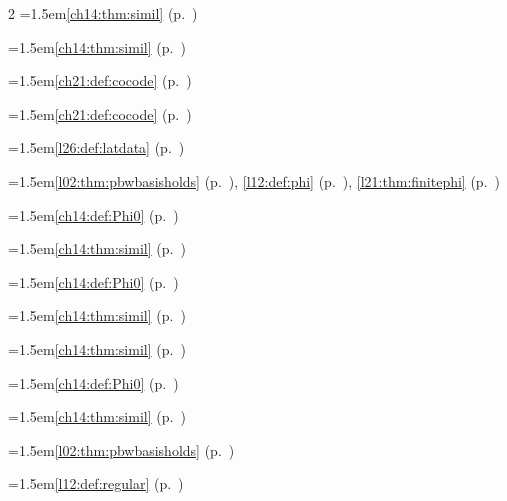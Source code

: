 \begin{multicols}{2}
\hangindent=1.5em\quad \ref{ch14:thm:simil} (p.~\pageref{ch14:thm:simil})\par
\hangindent=1.5em\quad \ref{ch14:thm:simil} (p.~\pageref{ch14:thm:simil})\par
\par{}\par\nopagebreak\smallskip
\hangindent=1.5em\quad \ref{ch21:def:cocode} (p.~\pageref{ch21:def:cocode})\par
\par{}\par\nopagebreak\smallskip
\hangindent=1.5em\quad \ref{ch21:def:cocode} (p.~\pageref{ch21:def:cocode})\par
\par{}\par\nopagebreak\smallskip
\hangindent=1.5em\quad \ref{l26:def:latdata} (p.~\pageref{l26:def:latdata})\par
\par{}\par\nopagebreak\smallskip
\hangindent=1.5em\quad \ref{l02:thm:pbwbasisholds} (p.~\pageref{l02:thm:pbwbasisholds}), \ref{l12:def:phi} (p.~\pageref{l12:def:phi}), \ref{l21:thm:finitephi} (p.~\pageref{l21:thm:finitephi})\par
\hangindent=1.5em\quad \ref{ch14:def:Phi0} (p.~\pageref{ch14:def:Phi0})\par
\hangindent=1.5em\quad \ref{ch14:thm:simil} (p.~\pageref{ch14:thm:simil})\par
\hangindent=1.5em\quad \ref{ch14:def:Phi0} (p.~\pageref{ch14:def:Phi0})\par
\hangindent=1.5em\quad \ref{ch14:thm:simil} (p.~\pageref{ch14:thm:simil})\par
\hangindent=1.5em\quad \ref{ch14:thm:simil} (p.~\pageref{ch14:thm:simil})\par
\hangindent=1.5em\quad \ref{ch14:def:Phi0} (p.~\pageref{ch14:def:Phi0})\par
\hangindent=1.5em\quad \ref{ch14:thm:simil} (p.~\pageref{ch14:thm:simil})\par
\hangindent=1.5em\quad \ref{l02:thm:pbwbasisholds} (p.~\pageref{l02:thm:pbwbasisholds})\par
\hangindent=1.5em\quad \ref{l12:def:regular} (p.~\pageref{l12:def:regular})\par

\end{multicols}
